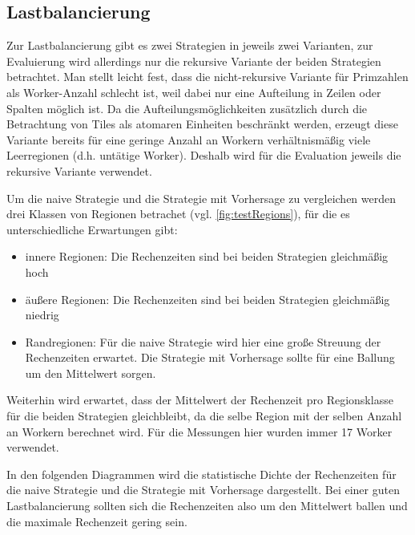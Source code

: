 \subsection{Lastbalancierung}\label{sec:lastbalancierung_eval}
Zur Lastbalancierung gibt es zwei Strategien in jeweils zwei Varianten, zur Evaluierung wird allerdings nur die rekursive Variante der beiden Strategien betrachtet.
Man stellt leicht fest, dass die nicht-rekursive Variante für Primzahlen als Worker-Anzahl schlecht ist, weil dabei nur eine Aufteilung in Zeilen oder Spalten möglich ist.
Da die Aufteilungsmöglichkeiten zusätzlich durch die Betrachtung von Tiles als atomaren Einheiten beschränkt werden, erzeugt diese Variante bereits für eine geringe Anzahl an Workern verhältnismäßig viele Leerregionen (d.h. untätige Worker).
Deshalb wird für die Evaluation jeweils die rekursive Variante verwendet.

Um die naive Strategie und die Strategie mit Vorhersage zu vergleichen werden drei Klassen von Regionen betrachet (vgl. \autoref{fig:testRegions}), für die es unterschiedliche Erwartungen gibt:

\begin{itemize}
	\item innere Regionen: Die Rechenzeiten sind bei beiden Strategien gleichmäßig hoch
	\item äußere Regionen: Die Rechenzeiten sind bei beiden Strategien gleichmäßig niedrig
	\item Randregionen: Für die naive Strategie wird hier eine große Streuung der Rechenzeiten erwartet. Die Strategie mit Vorhersage sollte für eine Ballung um den Mittelwert sorgen.
\end{itemize}

Weiterhin wird erwartet, dass der Mittelwert der Rechenzeit pro Regionsklasse für die beiden Strategien gleichbleibt, da die selbe Region mit der selben Anzahl an Workern berechnet wird.
Für die Messungen hier wurden immer 17 Worker verwendet.

In den folgenden Diagrammen wird die statistische Dichte der Rechenzeiten für die naive Strategie und die Strategie mit Vorhersage dargestellt.
Bei einer guten Lastbalancierung sollten sich die Rechenzeiten also um den Mittelwert ballen und die maximale Rechenzeit gering sein.

